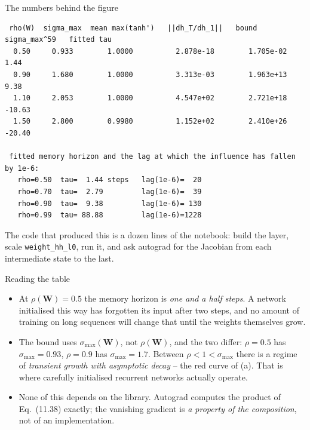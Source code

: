 \documentclass[10pt,aspectratio=169]{beamer}
\begin{document}
\begin{frame}[fragile]{The numbers behind the figure}
\begin{lstlisting}
 rho(W)  sigma_max  mean max(tanh')   ||dh_T/dh_1||   bound sigma_max^59   fitted tau
  0.50     0.933        1.0000          2.878e-18        1.705e-02           1.44
  0.90     1.680        1.0000          3.313e-03        1.963e+13           9.38
  1.10     2.053        1.0000          4.547e+02        2.721e+18         -10.63
  1.50     2.800        0.9980          1.152e+02        2.410e+26         -20.40

 fitted memory horizon and the lag at which the influence has fallen by 1e-6:
   rho=0.50  tau=  1.44 steps   lag(1e-6)=  20
   rho=0.70  tau=  2.79         lag(1e-6)=  39
   rho=0.90  tau=  9.38         lag(1e-6)= 130
   rho=0.99  tau= 88.88         lag(1e-6)=1228
\end{lstlisting}
\small
The code that produced this is a dozen lines of the notebook: build the
layer, scale \texttt{weight\_hh\_l0}, run it, and ask autograd for the
Jacobian from each intermediate state to the last.
\end{frame}

\begin{frame}{Reading the table}
\begin{itemize}
  \item At $\rho(\bm{W})=0.5$ the memory horizon is \emph{one and a half
        steps}.  A network initialised this way has forgotten its input
        after two steps, and no amount of training on long sequences will
        change that until the weights themselves grow.
  \item The bound uses $\sigma_{\max}(\bm{W})$, not $\rho(\bm{W})$, and the
        two differ: $\rho=0.5$ has $\sigma_{\max}=0.93$, $\rho=0.9$ has
        $\sigma_{\max}=1.7$.  Between $\rho<1<\sigma_{\max}$ there is a
        regime of \emph{transient growth with asymptotic decay} -- the
        red curve of (a).  That is where carefully initialised recurrent
        networks actually operate.
  \item None of this depends on the library.  Autograd computes the product
        of Eq.~(11.38) exactly; the vanishing gradient is \emph{a property
        of the composition}, not of an implementation.
\end{itemize}
\end{frame}
\end{document}
